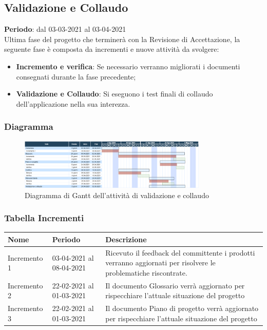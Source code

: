 	\subsection{Validazione e Collaudo}
	\textbf{Periodo}: dal 03-03-2021 al 03-04-2021 \\
	Ultima fase del progetto che terminerà con la Revisione di Accettazione, la seguente fase è composta da incrementi e nuove attività da svolgere:
	\begin{itemize}
		\item \textbf{Incremento e verifica}: Se necessario verranno migliorati i documenti consegnati durante la fase precedente;
		\item \textbf{Validazione e Collaudo}: Si eseguono i test finali di collaudo dell'applicazione nella sua interezza.
	\end{itemize}
	
	\subsubsection{Diagramma}
		\begin{figure}[H]
        		\centering
        		\includegraphics[width=0.8\textwidth]{source/img/Validazione_collaudo.png}
        		\caption{Diagramma di Gantt dell'attività di validazione e collaudo}
    		\end{figure}
	\subsubsection{Tabella Incrementi}
		\begin{center}
    			\begin{tabular}{ | l | p{5cm} | p{8cm} |}
   			 \hline
    			Nome & Periodo & Descrizione \\ \hline
    			Incremento 1 & 03-04-2021 al 08-04-2021 & Ricevuto il feedback del committente i prodotti verranno aggiornati per risolvere le problematiche riscontrate. \\ \hline
    			Incremento 2 & 22-02-2021 al 01-03-2021 & Il documento Glossario verrà aggiornato per rispecchiare l'attuale situazione del progetto \\ \hline
			Incremento 3 & 22-02-2021 al 01-03-2021 & Il documento Piano di progetto verrà aggiornato per rispecchiare l'attuale situazione del progetto \\ \hline
    			\end{tabular}
		\end{center}
